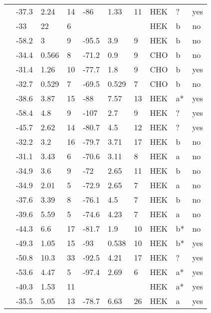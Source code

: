 \begin{longtable}{p{5cm}|lll|lll|lll}
\citet{Beckermann2014MutationDB} & -37.3 & 2.24 & 14 & -86 & 1.33 & 11 & HEK & ? & yes \\
\citet{Beyder2010MutationDB} & -33 & 22 & 6 & && & HEK & b & no \\
\citet{Beyder2014MutationDB} & -58.2 & 3 & 9 & -95.5 & 3.9 & 9 & HEK & b & no \\
\citet{Calloe2011MutationDB} & -34.4 & 0.566 & 8 & -71.2 & 0.9 & 9 & CHO & b & no \\
\citet{Calloe2011MutationDB} & -31.4 & 1.26 & 10 & -77.7 & 1.8 & 9 & CHO & b & yes \\
\citet{Calloe2013MutationDB} & -32.7 & 0.529 & 7 & -69.5 & 0.529 & 7 & CHO & b & no \\
\citet{Casini2007MutationDB} & -38.6 & 3.87 & 15 & -88 & 7.57 & 13 & HEK & a* & yes \\
\citet{Chang2004MutationDB} & -58.4 & 4.8 & 9 & -107 & 2.7 & 9 & HEK & ? & yes \\
\citet{Chen2016MutationDB} & -45.7 & 2.62 & 14 & -80.7 & 4.5 & 12 & HEK & ? & yes \\
\citet{Cheng2010MutationDB} & -32.2 & 3.2 & 16 & -79.7 & 3.71 & 17 & HEK & b & no \\
\citet{Cheng2010MutationDB} & -31.1 & 3.43 & 6 & -70.6 & 3.11 & 8 & HEK & a & no \\
\citet{Cheng2010MutationDB} & -34.9 & 3.6 & 9 & -72 & 2.65 & 11 & HEK & b & no \\
\citet{Cheng2010MutationDB} & -34.9 & 2.01 & 5 & -72.9 & 2.65 & 7 & HEK & a & no \\
\citet{Cheng2011MutationDB} & -37.6 & 3.39 & 8 & -76.1 & 4.5 & 7 & HEK & b & no \\
\citet{Cheng2011MutationDB} & -39.6 & 5.59 & 5 & -74.6 & 4.23 & 7 & HEK & a & no \\
\citet{Clatot2012MutationDB} & -44.3 & 6.6 & 17 & -81.7 & 1.9 & 10 & HEK & b* & no \\
\citet{Cordeiro2006MutationDB} & -49.3 & 1.05 & 15 & -93 & 0.538 & 10 & HEK & b* & yes \\
\citet{Crotti2012aMutationDB} & -50.8 & 10.3 & 33 & -92.5 & 4.21 & 17 & HEK & ? & yes \\
\citet{Deschenes2000MutationDB} & -53.6 & 4.47 & 5 & -97.4 & 2.69 & 6 & HEK & a* & yes \\
\citet{Detta2014MutationDB} & -40.3 & 1.53 & 11 & && & HEK & a* & yes \\
\citet{Ge2008MutationDB} & -35.5 & 5.05 & 13 & -78.7 & 6.63 & 26 & HEK & a & yes \\

\end{longtable}

